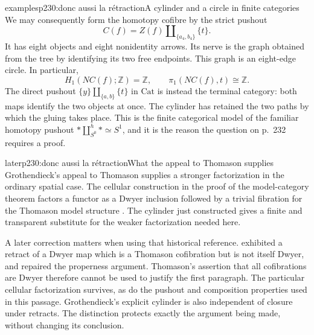\begin{dcomment}{examples}{p230:donc aussi la rétraction}{A cylinder and a circle in finite categories}
We may consequently form the homotopy cofibre by the strict pushout
\[
 C(f)=Z(f)\amalg_{\{a_4,b_4\}}\{t\}.
\]
It has eight objects and eight nonidentity arrows. Its nerve is the graph obtained from the tree by identifying its two free endpoints. This graph is an eight-edge circle. In particular,
\[
 H_1(NC(f);\mathbb Z)=\mathbb Z,
 \qquad \pi_1(NC(f),t)\cong\mathbb Z.
\]
The direct pushout $\{y\}\amalg_{\{a,b\}}\{t\}$ in $\mathrm{Cat}$ is instead the terminal category: both maps identify the two objects at once. The cylinder has retained the two paths by which the gluing takes place. This is the finite categorical model of the familiar homotopy pushout $*\amalg^h_{S^0}*\simeq S^1$, and it is the reason the question on p.~232 requires a proof.
\end{dcomment}

\begin{dcomment}{later}{p230:donc aussi la rétraction}{What the appeal to Thomason supplies}
Grothendieck's appeal to Thomason supplies a stronger factorization in the ordinary spatial case. The cellular construction in the proof of the model-category theorem factors a functor as a Dwyer inclusion followed by a trivial fibration for the Thomason model structure \citep[proof of CM5 and Theorem~4.9]{Thomason1980}. The cylinder just constructed gives a finite and transparent substitute for the weaker factorization needed here.

A later correction matters when using that historical reference. \citet{Cisinski1999Dwyer} exhibited a retract of a Dwyer map which is a Thomason cofibration but is not itself Dwyer, and repaired the properness argument. Thomason's assertion that all cofibrations are Dwyer therefore cannot be used to justify the first paragraph. The particular cellular factorization survives, as do the pushout and composition properties used in this passage. Grothendieck's explicit cylinder is also independent of closure under retracts. The distinction protects exactly the argument being made, without changing its conclusion.
\end{dcomment}

